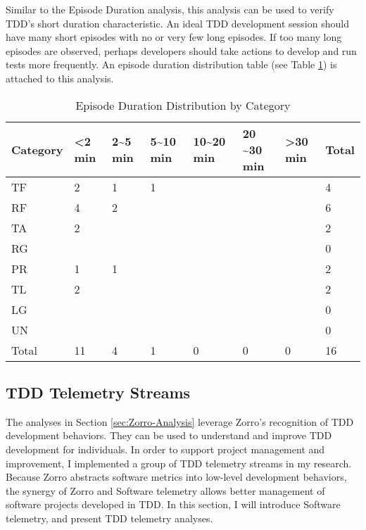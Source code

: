 Similar to the Episode Duration analysis, this analysis can be used to
verify TDD's short duration characteristic. An ideal TDD development 
session should have many short episodes with no or very few long episodes. 
If too many long episodes are observed, perhaps developers should take 
actions to develop and run tests more frequently. An episode duration 
distribution table (see Table \ref{tab:Zorro-Analysis-EpisodeDistribution})
is attached to this analysis.
\begin{table}[htbp]
\centering
  \caption{Episode Duration Distribution by Category}
  \begin{tabular}{llllllll} 
        Category & \textless 2 min & 2\~{}5 min & 5\~{}10 min & 10\~{}20 min & 20 \~{}30 min & \textgreater 30 min & Total \\ \hline
  TF      &  2  &  1 &   1  &  &        &  &  4  \\ 
  RF      &  4  &  2 &                  &  &    &  &    6  \\ 
  TA      &  2  &        &                      &  &    &  &    2  \\ 
  RG      &             &        &      &  &  &  &  0  \\ 
  PR      &  1  &  1 &                  &  &  &  &      2  \\ 
  TL      &  2  &        &                      &  &  &  &      2  \\ 
  LG      &     &        &                      &  &  &  &      0  \\ 
  UN      &             &        &                      &  &  &  &  0  \\ \hline
  Total &  11 &  4 &    1       & 0 & 0 & 0 &   16  \\  
  \end{tabular}
  \label{tab:Zorro-Analysis-EpisodeDistribution}
\end{table}

\newpage
\subsection{TDD Telemetry Streams}
\label{sec:Zorro-Analysis-Telemetry}
The analyses in Section \ref{sec:Zorro-Analysis} leverage
Zorro's recognition of TDD development behaviors. They can be used
to understand and improve TDD development for individuals. In order
to support project management and improvement, I implemented a
group of TDD telemetry streams in my research. Because Zorro 
abstracts software metrics into low-level development behaviors, 
the synergy of Zorro and Software telemetry allows better management 
of software projects developed in TDD. In this section, I will 
introduce Software telemetry, and present TDD telemetry analyses. 

